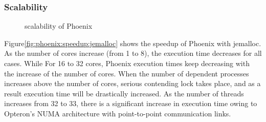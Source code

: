 \subsubsection{Scalability}

\begin{figure}[htpb]
	\centering
	\caption{scalability of Phoenix}
	\label{fig:phoenix:scalability}
\end{figure}

Figure\ref{fig:phoenix:speedup:jemalloc} shows the speedup of Phoenix with jemalloc.
As the number of cores increase (from 1 to 8), the execution time decreases for all cases. 
While For 16 to 32 cores, Phoenix execution times keep decreasing with the increase of the number of cores.
When the number of dependent processes increases above the
number of cores, serious contending lock takes place,
and as a result execution time will be drastically increased.
As the number of threads increases from 32 to 33, 
there is a significant increase in execution time owing to Opteron’s NUMA architecture with
point-to-point communication links.

